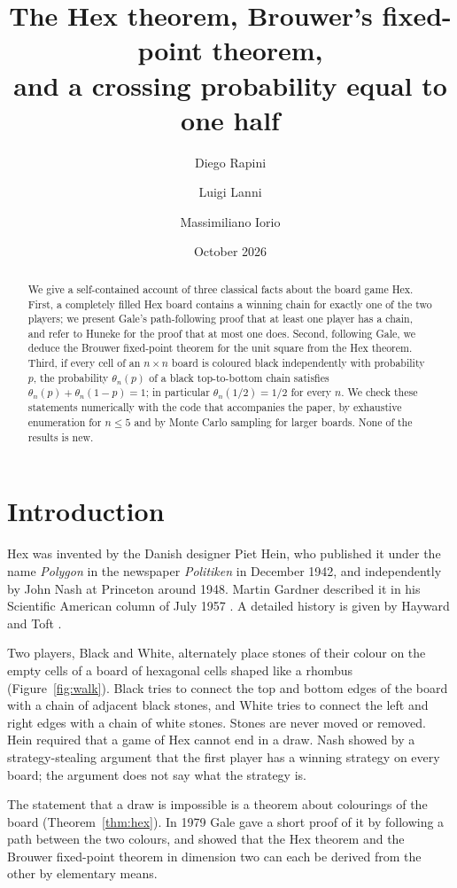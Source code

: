 \documentclass[11pt,a4paper]{amsart}
\title[The Hex theorem, Brouwer's theorem and a crossing probability]{The Hex theorem, Brouwer's fixed-point theorem,\\ and a crossing probability equal to one half}
\author{Diego Rapini}
\author{Luigi Lanni}
\author{Massimiliano Iorio}
\date{October 2026}
\theoremstyle{definition}
\theoremstyle{remark}
\begin{document}
\begin{abstract}
We give a self-contained account of three classical facts about the board game Hex. First, a completely filled Hex board contains a winning chain for exactly one of the two players; we present Gale's path-following proof that at least one player has a chain, and refer to Huneke for the proof that at most one does. Second, following Gale, we deduce the Brouwer fixed-point theorem for the unit square from the Hex theorem. Third, if every cell of an $n \times n$ board is coloured black independently with probability $p$, the probability $\theta_n(p)$ of a black top-to-bottom chain satisfies $\theta_n(p) + \theta_n(1-p) = 1$; in particular $\theta_n(1/2) = 1/2$ for every $n$. We check these statements numerically with the code that accompanies the paper, by exhaustive enumeration for $n \le 5$ and by Monte Carlo sampling for larger boards. None of the results is new.
\end{abstract}

\maketitle

\section{Introduction}

Hex was invented by the Danish designer Piet Hein, who published it under the name \emph{Polygon} in the newspaper \emph{Politiken} in December 1942, and independently by John Nash at Princeton around 1948. Martin Gardner described it in his Scientific American column of July 1957 \cite{gardner}. A detailed history is given by Hayward and Toft \cite{hayward-toft}.

Two players, Black and White, alternately place stones of their colour on the empty cells of a board of hexagonal cells shaped like a rhombus (Figure~\ref{fig:walk}). Black tries to connect the top and bottom edges of the board with a chain of adjacent black stones, and White tries to connect the left and right edges with a chain of white stones. Stones are never moved or removed. Hein required that a game of Hex cannot end in a draw. Nash showed by a strategy-stealing argument that the first player has a winning strategy on every board; the argument does not say what the strategy is.

The statement that a draw is impossible is a theorem about colourings of the board (Theorem~\ref{thm:hex}). In 1979 Gale \cite{gale} gave a short proof of it by following a path between the two colours, and showed that the Hex theorem and the Brouwer fixed-point theorem in dimension two can each be derived from the other by elementary means.
\end{document}
